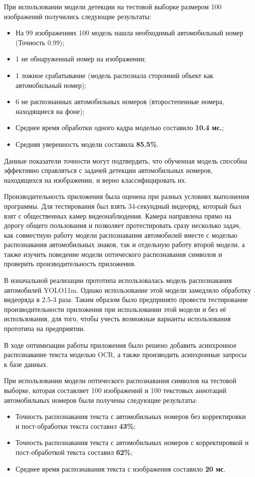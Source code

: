 \documentclass[a4paper,12pt]{article}
\begin{document}
При использовании модели детекции на тестовой выборке размером 100 изображений получились следующие результаты:
\begin{itemize}
    \item На 99 изображениях 100 модель нашла необходимый автомобильный номер (Точность 0.99);
    \item 1 не обнаруженный номер на изображении;
    \item 1 ложное срабатывание (модель распознала сторонний объект как автомобильный номер);
    \item 6 не распознанных автомобильных номеров (второстепенные номера, находящиеся на фоне);
    \item Среднее время обработки одного кадра моделью составило \textbf{10.4 мс.};
    \item Средняя уверенность модели составила \textbf{85.5\%}.
\end{itemize}

Данные показатели точности могут подтвердить, что обученная модель способна эффективно справляться с задачей детекции автомобильных номеров, находящихся на изображении, и верно классифицировать их.

Производительность приложения была оценена при разных условиях выполнения программы. Для тестирования был взять 34-секундный видеоряд, который был взят с общественных камер видеонаблюдения. Камера направлена прямо на дорогу общего пользования и позволяет протестировать сразу несколько задач, как совместную работу модели распознавания автомобилей вместе с моделью распознавания автомобильных знаков, так и отдельную работу второй модели, а также изучить поведение модели оптического распознавания символов и проверить производительность приложения. 

В изначальной реализации прототипа использовалась модель распознавания автомобилей YOLO11m. Однако использование этой модели замедляло обработку видеоряда в 2.5-3 раза.
Таким образом было предпринято провести тестирование производительности приложения при использовании этой модели и без её использования, для того, чтобы учесть возможные варианты использования прототипа на предприятии.

В ходе оптимизации работы приложения было решено добавить асинхронное распознавание текста моделью OCR, а также производить асинхронные запросы к базе данных.

При использовании модели оптического распознавания символов на тестовой выборке, которая составляет 100 изображений и 100 текстовых аннотаций автомобильных номеров были получены следующие результаты:
\begin{itemize}
    \item Точность распознавания текста с автомобильных номеров без корректировки и пост-обработки текста составил \textbf{43\%};
    \item Точность распознавания текста с автомобильных номеров с корректировкой и пост-обработкой текста составил \textbf{62\%};
    \item Среднее время распознавания текста с изображения составило \textbf{20 мс}.
\end{itemize}
\end{document}
